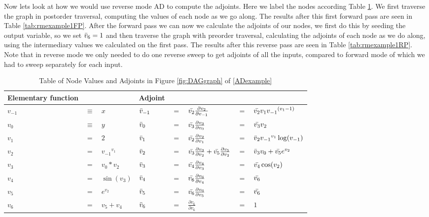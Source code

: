 \documentclass{article}
\begin{document}
Now lets look at how we would use reverse mode AD to compute the adjoints. Here we label the nodes according Table \ref{tab:rmexample1}. We first traverse the graph in postorder traversal, computing the values of each node as we go along. The results after this first forward pass are seen in Table \ref{tab:rmexample1FP}. After the forward pass we can now we calculate the adjoints of our nodes, we first do this by seeding the output variable, so we set $\Bar{v}_6 = 1$ and then traverse the graph with preorder traversal, calculating the adjoints of each node as we do along, using the intermediary values we calculated on the first pass. The results after this reverse pass are seen in Table \ref{tab:rmexample1RP}. Note that in reverse mode we only needed to do one reverse sweep to get adjoints of all the inputs, compared to forward mode of which we had to sweep separately for each input.

\begin{table}[h!]
    \centering
    \begin{tabular}{|lcl|lclll|}
        \hline
        Elementary function & & & Adjoint & & & &\\
        \hline
        $v_{-1}$ & $\equiv$ & $x$ & $\Bar{v}_{-1}$ & $=$ & $\Bar{v_2}\frac{\partial{v_2}}{\partial{v_{-1}}}$ & $=$ & $\Bar{v_2}v_1 {v_{-1}}^{(v_{1}-1)}$\\
        $v_{0}$ & $\equiv$ & $y$ & $\Bar{v}_{0}$ & $=$ & $\Bar{v_3}\frac{\partial{v_3}}{\partial{v_0}}$ & $=$ & $\Bar{v_3}v_2$\\
        \hline
        $v_{1}$ & $=$ & $2$ & $\Bar{v}_{1}$ & $=$ & $\Bar{v_2}\frac{\partial{v_2}}{\partial{v_1}}$ & $=$ & $\Bar{v}_{2}{v_{-1}}^{v_{1}}\log(v_{-1})$\\
        $v_{2}$ & $=$ & ${v_{-1}}^{v_{1}}$ & $\Bar{v}_{2}$ & $=$ & $\Bar{v_3}\frac{\partial{v_3}}{\partial{v_2}} + \Bar{v_5}\frac{\partial{v_5}}{\partial{v_2}}$ & $=$ & $\Bar{v}_{3}v_0 + \Bar{v_5}e^{v_2}$\\
        $v_{3}$ & $=$ & ${v_{0}}*{v_{2}}$ & $\Bar{v}_{3}$ & $=$ & $\Bar{v_4}\frac{\partial{v_4}}{\partial{v_3}}$ & $=$ & $\Bar{v_4}\cos(v_2)$\\
        $v_{4}$ & $=$ & $\sin(v_3)$ & $\Bar{v}_{4}$ & $=$ & $\Bar{v_6}\frac{\partial{v_6}}{\partial{v_4}}$ & $=$ & $\Bar{v_6}$\\
        $v_{5}$ & $=$ & $e^{v_2}$ & $\Bar{v}_{5}$ & $=$ & $\Bar{v_6}\frac{\partial{v_6}}{\partial{v_5}}$ & $=$ & $\Bar{v_6}$\\
        \hline
        $v_{6}$ & $=$ & $v_5 + v_4$ & $\Bar{v}_{6}$ & $=$ & $\frac{\partial{v_6}}{\partial{v_6}}$ & $=$ & $1$\\
        \hline
    \end{tabular}
    \caption{Table of Node Values and Adjoints in Figure \ref{fig:DAGgraph} of \eqref{ADexample}}
    \label{tab:rmexample1}
\end{table}
\end{document}
